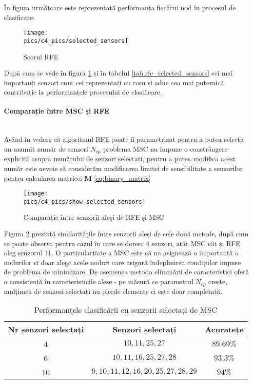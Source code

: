 În figura următoare este reprezentată performanța fiecărui nod în procesul de clasificare:

\begin{figure}[H]
\centering
\texttt{[image: \\pics/c4\_pics/selected\_sensors]}
\caption{Scorul RFE}
\label{fig:rfe_score}
\end{figure}

După cum se vede în figura \ref{fig:rfe_score} și în tabelul \ref{tab:rfe_selected_sensors} cei mai importanți senzori sunt cei reprezentați cu roșu și aduc cea mai puternică contribuție la performanțele procesului de clasificare.

\paragraph{Comparație între MSC și RFE} \mbox{} \\ 
Având în vedere că algoritmul RFE poate fi parametrizat pentru a putea selecta un anumit număr de senzori $N_{cp}$ problema MSC nu impune o constrângere explicită asupra numărului de senzori selectați, pentru a putea modifica acest număr este nevoie să considerăm modificarea limitei de sensibilitate a senzorilor pentru calcularea matricei $\mathbf{M}$ \eqref{eq:binary_matrix}

\begin{figure}[H]
\centering
\texttt{[image: \\pics/c4\_pics/show\_selected\_sensors]}
\caption{Comparație între senzorii aleși de  RFE și MSC}
\label{fig:rfe_vs_msc}
\end{figure}

Figura \ref{fig:rfe_vs_msc} prezintă similaritățile între senzorii aleși de cele două metode, după cum se poate observa pentru cazul în care se doresc 4 senzori, atât MSC cât și RFE aleg senzorul 11. O particulartiate a MSC este că nu asignează o importanță a nodurilor ci doar alege acele noduri care asigură îndeplinirea condițiilor impuse de problema de minimizare. De asemenea metoda eliminării de caracteristici oferă o consistență în caracteristicile alese - pe măsură ce parametrul $N_{cp}$ crește, mulțimea de senzori selectați nu pierde elemente ci este doar completată.

\begin{table}[H]
    \centering
    \begin{tabular}{|c|c|c|}
    \hline
        Nr senzori selectați & Senzori selectați & Acuratețe \\
        \hline
        4 & $10, 11, 25, 27$ & $89.69\%$ \\
        \hline
        6 & $10, 11, 16,25, 27,28 $ & $93.3\%$\\
        \hline
        10 & $9,10, 11, 12, 16, 20, 25, 27, 28, 29$ & $94\%$\\
        \hline
    \end{tabular}
    \caption{Performanțele clasificării cu senzorii selectați de MSC}
    \label{tab:msc_selected_sensors}
\end{table}